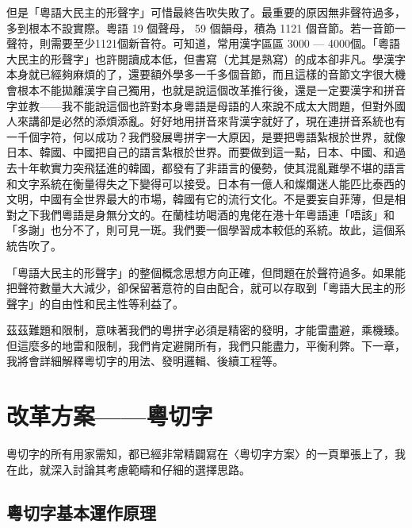 \documentclass[a5paper, 12pt, openany]{book} %
\begin{document}
但是「粵語大民主的形聲字」可惜最終告吹失敗了。最重要的原因無非聲符過多，多到根本不設實際。粵語 19 個聲母， 59 個韻母，積為 1121 個音節。若一音節一聲符，則需要至少1121個新音符。可知道，常用漢字區區 3000 — 4000個。「粵語大民主的形聲字」也許閱讀成本低，但書寫（尤其是熟寫）的成本卻非凡。學漢字本身就已經夠麻煩的了，還要額外學多一千多個音節，而且這樣的音節文字很大機會根本不能拋離漢字自己獨用，也就是說這個改革推行後，還是一定要漢字和拼音字並教——我不能說這個也許對本身粵語是母語的人來說不成太大問題，但對外國人來講卻是必然的添煩添亂。好好地用拼音來背漢字就好了，現在連拼音系統也有一千個字符，何以成功？我們發展粵拼字一大原因，是要把粵語紮根於世界，就像日本、韓國、中國把自己的語言紮根於世界。而要做到這一點，日本、中國、和過去十年軟實力突飛猛進的韓國，都發有了非語言的優勢，使其混亂難學不堪的語言和文字系統在衡量得失之下變得可以接受。日本有一億人和燦爛迷人能匹比泰西的文明，中國有全世界最大的市場，韓國有它的流行文化。不是要妄自菲薄，但是相對之下我們粵語是身無分文的。在蘭桂坊喝酒的鬼佬在港十年粵語連「唔該」和「多謝」也分不了，則可見一斑。我們要一個學習成本較低的系統。故此，這個系統告吹了。

「粵語大民主的形聲字」的整個概念思想方向正確，但問題在於聲符過多。如果能把聲符數量大大減少，卻保留著意符的自由配合，就可以存取到「粵語大民主的形聲字」的自由性和民主性等利益了。


茲茲難題和限制，意味著我們的粵拼字必須是精密的發明，才能雷盡避，乘機臻。但這麼多的地雷和限制，我們肯定避開所有，我們只能盡力，平衡利弊。下一章，我將會詳細解釋粵切字的用法、發明邏輯、後續工程等。
 
\chapter{改革方案——粵切字}

粵切字的所有用家需知，都已經非常精闢寫在〈粵切字方案〉的一頁單張上了，我在此，就深入討論其考慮範疇和仔細的選擇思路。

\section{粵切字基本運作原理}
\end{document}
